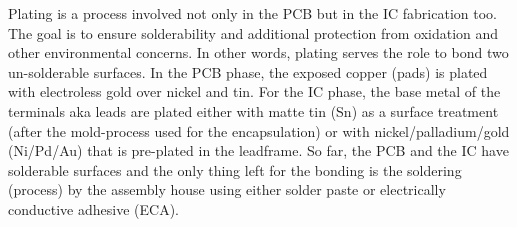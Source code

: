 \documentclass[final]{cubedoc}
\begin{document}
	
	
	
	
	
	
	
	
	
	
	
	Plating is a process involved not only in the PCB but in the IC fabrication too. The goal is to ensure solderability and additional protection from oxidation and other environmental concerns. In other words, plating serves the role to bond two un-solderable surfaces. In the PCB phase, the exposed copper (pads) is plated with electroless gold over nickel and tin. For the IC phase, the base metal of the terminals aka leads are plated either with matte tin (Sn) as a surface treatment (after the mold-process used for the encapsulation) or with  nickel/palladium/gold (Ni/Pd/Au) that is pre-plated in the leadframe. So far, the PCB and the IC have solderable surfaces and the only thing left for the bonding is the soldering (process) by the assembly house using either solder paste or electrically conductive adhesive (ECA).  
	
\end{document}
